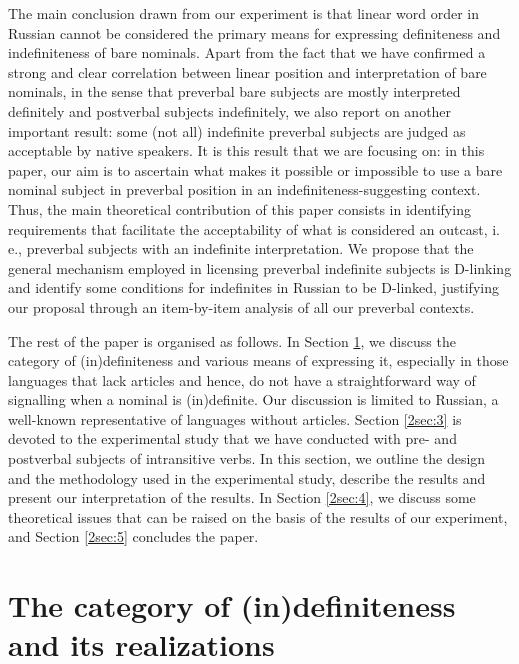 \documentclass[output=paper]{langsci/langscibook}
\begin{document}
The main conclusion drawn from our experiment is that linear word order in Russian cannot be considered the primary means for expressing definiteness and indefiniteness of bare nominals. Apart from the fact that we have confirmed a strong and clear correlation between linear position and interpretation of bare nominals, in the sense that preverbal bare subjects are mostly interpreted definitely and postverbal subjects indefinitely, we also report on another important result: some (not all) indefinite preverbal subjects are judged as acceptable by native speakers. It is this result that we are focusing on: in this paper, our aim is to ascertain what makes it possible or impossible to use a bare nominal subject in preverbal position in an indefiniteness-suggesting context. Thus, the main theoretical contribution of this paper consists in identifying requirements that facilitate the acceptability of what is considered an outcast, i.\,e., preverbal subjects with an indefinite interpretation. We propose that the general mechanism employed in licensing preverbal indefinite subjects is D-linking and identify some conditions for indefinites in Russian to be D-linked, justifying our proposal through an item-by-item analysis of all our preverbal contexts.

{
The rest of the paper is organised as follows. In Section \ref{2sec:2}, we discuss the category of (in)definiteness and various means of expressing it, especially in those languages that lack articles and hence, do not have a straightforward way of signalling when a nominal is (in)definite. Our discussion is limited to Russian, a well-known representative of languages without articles. Section \ref{2sec:3} is devoted to the experimental study that we have conducted with pre- and postverbal subjects of intransitive verbs. In this section, we outline the design and the methodology used in the experimental study, describe the results and present our interpretation of the results. In Section \ref{2sec:4}, we discuss some theoretical issues that can be raised on the basis of the results of our experiment, and Section \ref{2sec:5} concludes the paper.
}

\section{The category of (in)definiteness and its realizations}\label{2sec:2}
\end{document}
